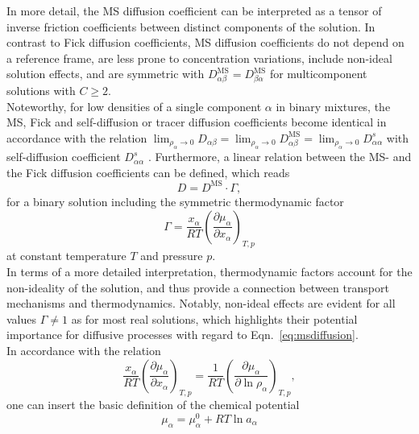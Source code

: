 \documentclass[aip,jcp,reprint]{revtex4-1}
\begin{document}
In more detail, the MS diffusion coefficient can be interpreted as a tensor of  inverse friction coefficients between distinct  components of the solution. In contrast to Fick diffusion coefficients, MS diffusion coefficients do not depend on a reference frame, are  less prone to concentration variations, include non-ideal solution effects, and  are symmetric with $D_{\alpha\beta}^{\text{MS}}=D_{\beta\alpha}^{\text{MS}}$ for multicomponent solutions with $C\geq 2$.\\ Noteworthy, for low densities of a single component $\alpha$  in binary mixtures, the MS, Fick and self-diffusion or tracer diffusion coefficients become identical  in accordance with the relation\cite{liu13a}  $\lim_{\rho_{\alpha}\rightarrow 0}D_{\alpha\beta}=\lim_{\rho_{\alpha}\rightarrow 0}D_{\alpha\beta}^{\text{MS}} = \lim_{\rho_{\alpha}\rightarrow 0} D_{\alpha\alpha}^s$  with self-diffusion coefficient $D_{\alpha\alpha}^s$ \cite{bardow15a,liu11a,liu13a}.
Furthermore, a linear relation between the MS- and the Fick diffusion coefficients can be defined, which reads
\begin{equation}
	\label{eq:msdiffusion}
	D= D^{\text{MS}}\cdot \Gamma,
\end{equation}
for a binary solution \cite{taylor93a,balsara15a,janzen17a}  including  the symmetric thermodynamic factor\cite{guevara16a,janzen17a,lecce17a}
\begin{equation}
	\label{eq:thermodyn_fact}
	\Gamma=\frac{x_{\alpha}}{RT}\left(\frac{\partial \mu_{\alpha}}{\partial x_{\alpha}}\right)_{T,p}
\end{equation}
at constant temperature $T$ and pressure $p$.\\
In terms of a more detailed interpretation, thermodynamic factors account for the non-ideality of the solution, and thus provide a connection between transport mechanisms and thermodynamics.  Notably, non-ideal effects are  evident for all values $\Gamma \neq 1$ as for most real solutions, which highlights their potential importance for diffusive processes with regard to Eqn.~\eqref{eq:msdiffusion}.\\
In accordance with the relation
\begin{equation}
	\label{eq:Gamma}
	\frac{x_{\alpha}}{RT}\left(\frac{\partial \mu_{\alpha}}{\partial x_{\alpha}}\right)_{T,p} = \frac{1}{RT}\left(\frac{\partial \mu_{\alpha}}{\partial \ln \rho_{\alpha}}\right)_{T,p},
\end{equation}
one can insert the basic definition of the chemical potential
\begin{equation}
	\mu_{\alpha} = \mu_{\alpha}^0 + RT\ln a_{\alpha}
\end{equation}
\end{document}
